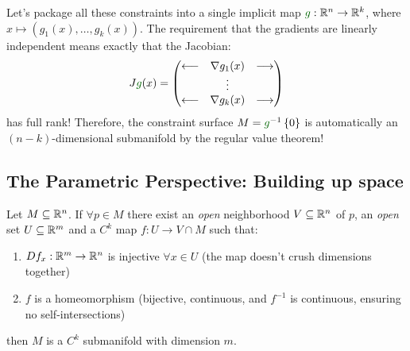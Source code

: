Let's package all these constraints into a single implicit map $\textcolor{eDarkGreen}{g}: \R^n \to \R^k$, where $x \mapsto (g_1(x), \dots, g_k(x))$. The requirement that the gradients are linearly independent means exactly that the Jacobian:
\[ J\textcolor{eDarkGreen}{g}(x) = \begin{pmatrix} \longleftarrow & \nabla g_1(x) & \longrightarrow \\ & \vdots & \\ \longleftarrow & \nabla g_k(x) & \longrightarrow \end{pmatrix} \]
has full rank! Therefore, the constraint surface $M = \textcolor{eDarkGreen}{g}^{-1}\set{0}$ is automatically an $(n-k)$-dimensional submanifold by the regular value theorem!



\subsection*{The Parametric Perspective: Building up space}

\begin{theorem*}
Let $M \subseteq \mathbb{R}^n$. If $\forall p \in M$ there exist an \emph{open} neighborhood $V \subseteq \mathbb{R}^n$ of $p$, an \emph{open} set $U \subseteq \mathbb{R}^m$ and a $C^k$ map $f: U \to V \cap M$ such that:
\begin{enumerate}
    \item $Df_x: \mathbb{R}^m \to \mathbb{R}^n$ is injective $\forall x \in U$ \textcolor{eGray}{(the map doesn't crush dimensions together)}
    \item $f$ is a homeomorphism \textcolor{eGray}{(bijective, continuous, and $f^{-1}$ is continuous, ensuring no self-intersections)}
\end{enumerate}
then $M$ is a $C^k$ submanifold with dimension $m$.
\end{theorem*}

